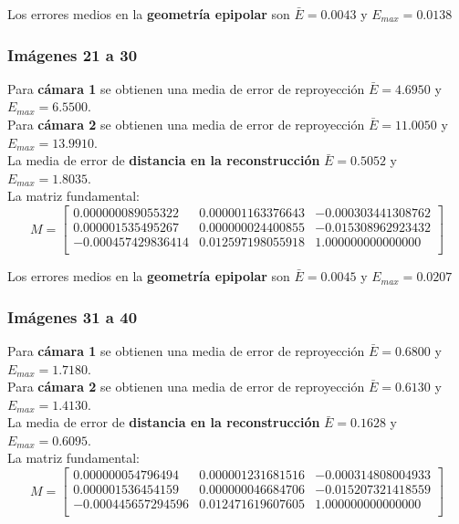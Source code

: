 \documentclass[a4paper, fontsize=11pt]{scrartcl} %
\numberwithin{equation}{section} %
\numberwithin{figure}{section} %
\numberwithin{table}{section} %
\begin{document}
	Los errores medios en la \textbf{geometría epipolar} son $\bar{E} = 0.0043$ y $E_{max} = 0.0138$
	
	\subsubsection*{Imágenes 21 a 30}
	
	Para \textbf{cámara 1} se obtienen una media de error de reproyección $\bar{E} = 4.6950$ y $E_{max} = 6.5500$.\\
	Para \textbf{cámara 2} se obtienen una media de error de reproyección $\bar{E} = 11.0050$ y $E_{max} = 13.9910$.\\
	
	La media de error de \textbf{distancia en la reconstrucción} $\bar{E} = 0.5052$ y $E_{max} = 1.8035$.\\
	La matriz fundamental:
	\[
	M=
	\begin{bmatrix}
	0.000000089055322&	0.000001163376643&	-0.000303441308762 \\
	0.000001535495267&	0.000000024400855&	-0.015308962923432 \\
	-0.000457429836414&	0.012597198055918&	1.000000000000000  \\
	
	\end{bmatrix}
	\]
	
	Los errores medios en la \textbf{geometría epipolar} son $\bar{E} = 0.0045$ y $E_{max} = 0.0207$
	
	\subsubsection*{Imágenes 31 a 40}
	
	Para \textbf{cámara 1} se obtienen una media de error de reproyección $\bar{E} = 0.6800$ y $E_{max} = 1.7180$.\\
	Para \textbf{cámara 2} se obtienen una media de error de reproyección $\bar{E} = 0.6130$ y $E_{max} = 1.4130$.\\
	
	La media de error de \textbf{distancia en la reconstrucción} $\bar{E} = 0.1628$ y $E_{max} = 0.6095$.\\
	La matriz fundamental:
	\[
	M=
	\begin{bmatrix}
	0.000000054796494&	0.000001231681516&	-0.000314808004933 \\
	0.000001536454159&	0.000000046684706&	-0.015207321418559 \\
	-0.000445657294596&	0.012471619607605&	1.000000000000000 \\
	
	\end{bmatrix}
	\]
	
\end{document}
